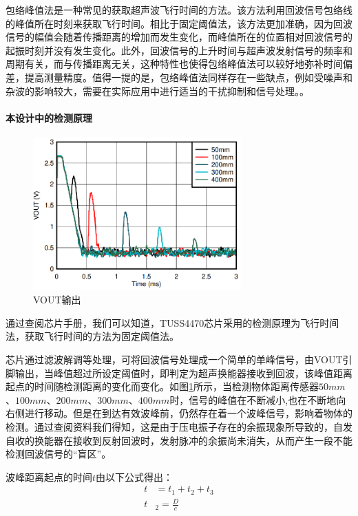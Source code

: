 	包络峰值法是一种常见的获取超声波飞行时间的方法。该方法利用回波信号包络线的峰值所在时刻来获取飞行时间。相比于固定阈值法，该方法更加准确，因为回波信号的幅值会随着传播距离的增加而发生变化，而峰值所在的位置相对回波信号的起振时刻并没有发生变化。此外，回波信号的上升时间与超声波发射信号的频率和周期有关，而与传播距离无关，这种特性也使得包络峰值法可以较好地弥补时间偏差，提高测量精度。值得一提的是，包络峰值法同样存在一些缺点，例如受噪声和杂波的影响较大，需要在实际应用中进行适当的干扰抑制和信号处理。。
	\paragraph{本设计中的检测原理}
		
    \begin{figure}[!h]
     	\centering
    	\includegraphics[width=8cm]{figure/VOUT image.png}
    	\caption{VOUT输出}
    	\label{VOUT输出}
    \end{figure}\par
    通过查阅芯片手册，我们可以知道，TUSS4470芯片采用的检测原理为飞行时间法，获取飞行时间的方法为固定阈值法。\par
    芯片通过滤波解调等处理，可将回波信号处理成一个简单的单峰信号，由VOUT引脚输出，当峰值超过所设定阈值时，即判定为超声换能器接收到回波，该峰值距离起点的时间随检测距离的变化而变化。如图\ref{VOUT输出}所示，当检测物体距离传感器$50mm$、$100mm$、$200mm$、$300mm$、$400mm$时，信号的峰值在不断减小,也在不断地向右侧进行移动。但是在到达有效波峰前，仍然存在着一个波峰信号，影响着物体的检测。通过查阅资料我们得知，这是由于压电振子存在的余振现象所导致的，自发自收的换能器在接收到反射回波时，发射脉冲的余振尚未消失，从而产生一段不能检测回波信号的“盲区”。\par
    波峰距离起点的时间$t$由以下公式得出：       
    \begin{align}
    	t&=t_1+t_2+t_3 \\
    	t&_2=\frac{D}{c}
    	\label{检测周期公式}
    \end{align}  
